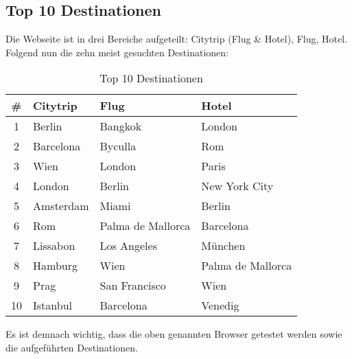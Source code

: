 \subsection{Top 10 Destinationen}
Die Webseite ist in drei Bereiche aufgeteilt: Citytrip (Flug \& Hotel), Flug, Hotel. Folgend nun die zehn meist gesuchten Destinationen:
\begin{table}[H] 
	\caption{Top 10 Destinationen}
	\centering
	\label{sec:Recherche:Zielgruppe:top10}
	
	\begin{tabular}{ | c | l | l | l | } 
		\hline 
		\textbf{\#} & \textbf{Citytrip} & \textbf{Flug} & \textbf{Hotel} \\ \hline 
		1 & Berlin & Bangkok & London \\ \hline
		2 & Barcelona & Byculla & Rom \\ \hline
		3 & Wien & London & Paris \\ \hline
		4 & London & Berlin & New York City \\ \hline
		5 & Amsterdam & Miami & Berlin \\ \hline
		6 & Rom & Palma de Mallorca & Barcelona \\ \hline
		7 & Lissabon & Los Angeles & München \\ \hline
		8 & Hamburg & Wien  & Palma de Mallorca \\ \hline
		9 & Prag & San Francisco & Wien \\ \hline
		10 & Istanbul & Barcelona & Venedig \\ \hline
	\end{tabular} 
\end{table}

Es ist demnach wichtig, dass die oben genannten Browser getestet werden sowie die aufgeführten Destinationen.